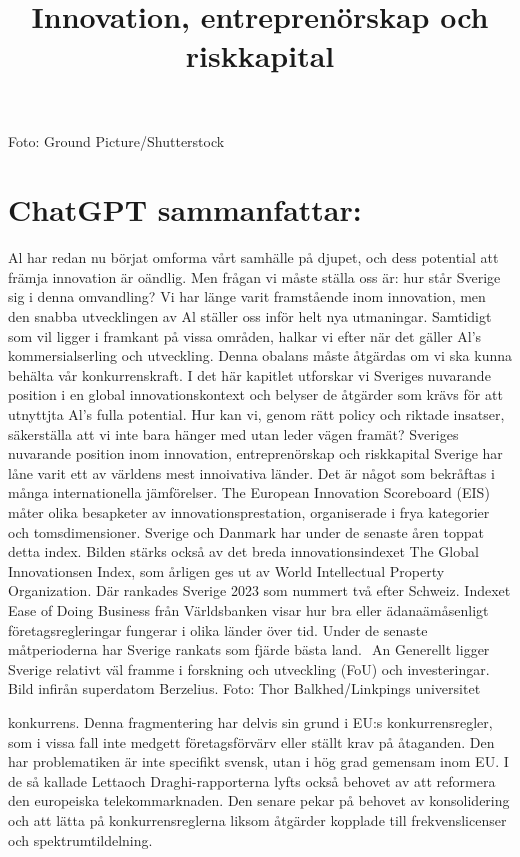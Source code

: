 {{{{{{{{{{{{{{{{{{{Foto: Ground Picture/Shutterstock

\title{
Innovation, entreprenörskap och riskkapital
}
\section*{ChatGPT sammanfattar:}
Al har redan nu börjat omforma vårt samhälle på djupet, och dess potential att främja innovation är oändlig. Men frågan vi måste ställa oss är: hur står Sverige sig i denna omvandling? Vi har länge varit framstående inom innovation, men den snabba utvecklingen av Al ställer oss inför helt nya utmaningar. Samtidigt som vil ligger i framkant på vissa områden, halkar vi efter när det gäller Al's kommersialserling och utveckling. Denna obalans måste åtgärdas om vi ska kunna behälta vår konkurrenskraft.
I det här kapitlet utforskar vi Sveriges nuvarande position i en global innovationskontext och belyser de åtgärder som krävs för att utnyttjta Al's fulla potential. Hur kan vi, genom rätt policy och riktade insatser, säkerställa att vi inte bara hänger med utan leder vägen framät?
Sveriges nuvarande position inom innovation, entreprenörskap och riskkapital
Sverige har låne varit ett av världens mest innoivativa länder. Det är något som bekråftas i många internationella jämförelser. The European Innovation Scoreboard (EIS) måter olika besapketer av innovationsprestation, organiserade i frya kategorier och tomsdimensioner. Sverige och Danmark har under de senaste åren toppat detta index. Bilden stärks också av det breda innovationsindexet The Global Innovationsen Index, som årligen ges ut av World Intellectual Property Organization. Där rankades Sverige 2023 som nummert två efter Schweiz. Indexet Ease of Doing
Business från Världsbanken visar hur bra eller ädanaämåsenligt företagsregleringar fungerar i olika länder över tid. Under de senaste måtperioderna har Sverige rankats som fjärde bästa land. \({ }^{}\) An
Generellt ligger Sverige relativt väl framme i forskning och utveckling (FoU) och investeringar. Bild infirån superdatom Berzelius. Foto: Thor Balkhed/Linkpings universitet

konkurrens. Denna fragmentering har delvis sin grund i EU:s konkurrensregler, som i vissa fall inte medgett företagsförvärv eller ställt krav på åtaganden. Den har problematiken är inte specifikt svensk, utan i hög grad gemensam inom EU. I de så kallade Lettaoch Draghi-rapporterna lyfts också behovet av att reformera den europeiska telekommarknaden. Den senare pekar på behovet av konsolidering och att lätta på konkurrensreglerna liksom åtgärder kopplade till frekvenslicenser och spektrumtildelning.
}}}}}}}}}}}}}}}}}}}
